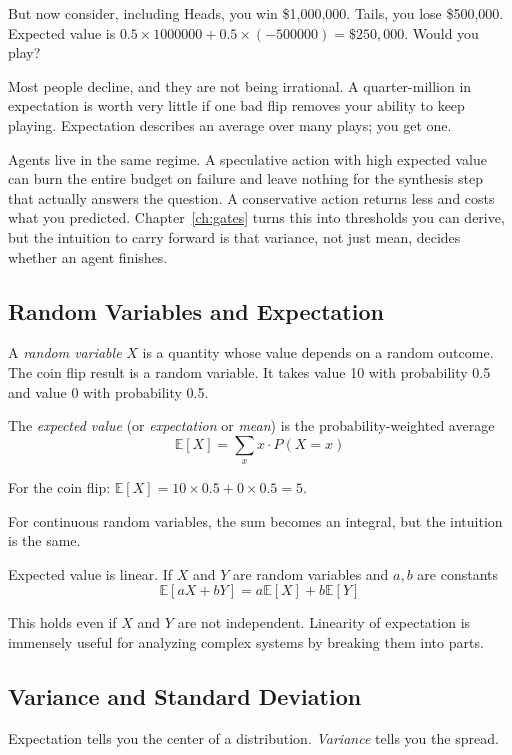 But now consider, including Heads, you win \$1,000,000. Tails, you lose \$500,000. Expected value is $0.5 \times 1000000 + 0.5 \times (-500000) = \$250,000$. Would you play?

Most people decline, and they are not being irrational. A quarter-million in expectation is worth very little if one bad flip removes your ability to keep playing. Expectation describes an average over many plays; you get one.

Agents live in the same regime. A speculative action with high expected value can burn the entire budget on failure and leave nothing for the synthesis step that actually answers the question. A conservative action returns less and costs what you predicted. Chapter~\ref{ch:gates} turns this into thresholds you can derive, but the intuition to carry forward is that variance, not just mean, decides whether an agent finishes.

\subsection{Random Variables and Expectation}

A \textit{random variable} $X$ is a quantity whose value depends on a random outcome. The coin flip result is a random variable. It takes value 10 with probability 0.5 and value 0 with probability 0.5.

The \textit{expected value} (or \textit{expectation} or \textit{mean}) is the probability-weighted average
\[
\mathbb{E}[X] = \sum_x x \cdot P(X = x)
\]

For the coin flip: $\mathbb{E}[X] = 10 \times 0.5 + 0 \times 0.5 = 5$.

For continuous random variables, the sum becomes an integral, but the intuition is the same.

Expected value is linear. If $X$ and $Y$ are random variables and $a, b$ are constants
\[
\mathbb{E}[aX + bY] = a\mathbb{E}[X] + b\mathbb{E}[Y]
\]

This holds even if $X$ and $Y$ are not independent. Linearity of expectation is immensely useful for analyzing complex systems by breaking them into parts.

\subsection{Variance and Standard Deviation}

Expectation tells you the center of a distribution. \textit{Variance} tells you the spread.

